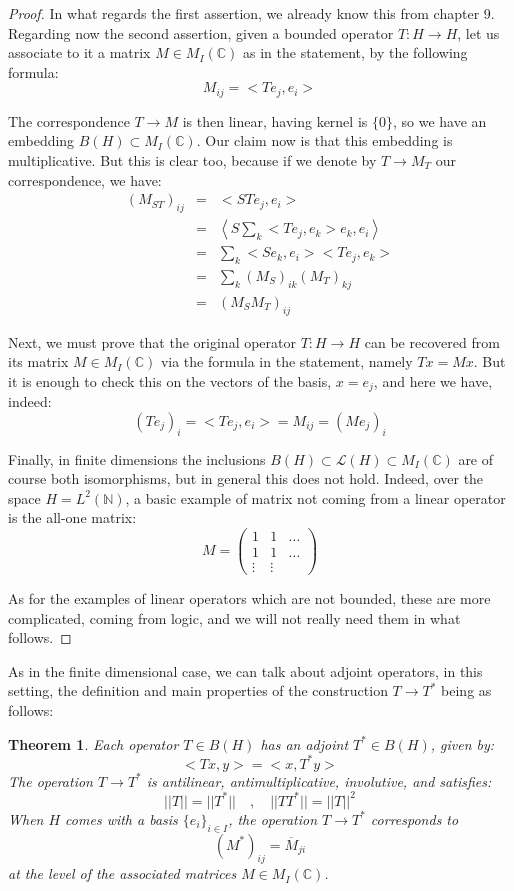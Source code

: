 \documentclass[12pt]{amsbook}
\newtheorem{theorem}{Theorem}[chapter]
\begin{document}
\begin{proof}
In what regards the first assertion, we already know this from chapter 9. Regarding now the second assertion, given a bounded operator $T:H\to H$, let us associate to it a matrix $M\in M_I(\mathbb C)$ as in the statement, by the following formula:
$$M_{ij}=<Te_j,e_i>$$

The correspondence $T\to M$ is then linear, having kernel is $\{0\}$, so we have an embedding $B(H)\subset M_I(\mathbb C)$. Our claim now is that this embedding is multiplicative. But this is clear too, because if we denote by $T\to M_T$ our correspondence, we have:
\begin{eqnarray*}
(M_{ST})_{ij}
&=&<STe_j,e_i>\\
&=&\left<S\sum_k<Te_j,e_k>e_k,e_i\right>\\
&=&\sum_k<Se_k,e_i><Te_j,e_k>\\
&=&\sum_k(M_S)_{ik}(M_T)_{kj}\\
&=&(M_SM_T)_{ij}
\end{eqnarray*}

Next, we must prove that the original operator $T:H\to H$ can be recovered from its matrix $M\in M_I(\mathbb C)$ via the formula in the statement, namely $Tx=Mx$. But it is enough to check this on the vectors of the basis, $x=e_j$, and here we have, indeed:
$$(Te_j)_i
=<Te_j,e_i>
=M_{ij}
=(Me_j)_i$$

Finally, in finite dimensions the inclusions $B(H)\subset\mathcal L(H)\subset M_I(\mathbb C)$ are of course both isomorphisms, but in general this does not hold. Indeed, over the space $H=L^2(\mathbb N)$, a basic example of matrix not coming from a linear operator is the all-one matrix:
$$M=\begin{pmatrix}1&1&\ldots\\
1&1&\ldots\\
\vdots&\vdots
\end{pmatrix}$$

As for the examples of linear operators which are not bounded, these are more complicated, coming from logic, and we will not really need them in what follows.
\end{proof}

As in the finite dimensional case, we can talk about adjoint operators, in this setting, the definition and main properties of the construction $T\to T^*$ being as follows:


\begin{theorem}
Each operator $T\in B(H)$ has an adjoint $T^*\in B(H)$, given by: 
$$<Tx,y>=<x,T^*y>$$
The operation $T\to T^*$ is antilinear, antimultiplicative, involutive, and satisfies:
$$||T||=||T^*||\quad,\quad ||TT^*||=||T||^2$$
When $H$ comes with a basis $\{e_i\}_{i\in I}$, the operation $T\to T^*$ corresponds to
$$(M^*)_{ij}=\overline{M}_{ji}$$ 
at the level of the associated matrices $M\in M_I(\mathbb C)$.
\end{theorem}
\end{document}
